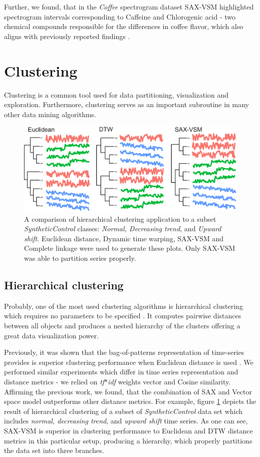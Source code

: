 \documentclass{llncs}
\newcommand{\myfigureshrinker}{\vspace{-1cm}}
\begin{document}
Further, we found, that in the \textit{Coffee} spectrogram dataset SAX-VSM highlighted spectrogram
intervals corresponding to Caffeine and Chlorogenic acid - two chemical compounds responsible for
the differences in coffee flavor, which also aligns with previously reported findings \cite{coffee}.
\section{Clustering}
Clustering is a common tool used for data partitioning, visualization and exploration. Furthermore, 
clustering serves as an important subroutine in many other data mining algorithms.
\begin{figure}[t]
   \myfigureshrinker
   \centering
   \includegraphics[width=115mm]{figures/clustering.eps}
   \caption{A comparison of hierarchical clustering application to a subset 
\textit{SyntheticControl} classes: \textit{Normal, Decreasing trend}, and \textit{Upward shift}. 
Euclidean distance, Dynamic time warping, SAX-VSM and Complete linkage were used to 
generate these plots. Only SAX-VSM was able to partition series properly.                           
   }
   \label{fig:hc}
\end{figure}

\subsection{Hierarchical clustering}
Probably, one of the most used clustering algorithms is hierarchical clustering which requires no
parameters to be specified \cite{hcs}. It computes pairwise distances between all objects and 
produces a nested hierarchy of the clusters offering a great data visualization power. 

Previously, it was shown that the bag-of-patterns representation of time-series
provides is superior clustering performance when Euclidean distance is used \cite{bag_patterns}. 
We performed similar experiments which differ in time series representation and distance
metrics - we relied on \textit{tf$\ast$idf} weights vector and Cosine similarity. 
Affirming the previous work, we found, that the combination of SAX and Vector space model
outperforms other distance metrics. For example, figure \ref{fig:hc} depicts the result 
of hierarchical clustering of a subset of \textit{SyntheticControl} data set which
includes \textit{normal, decreasing trend}, and \textit{upward shift} time series.
As one can see, SAX-VSM is superior in clustering performance to Euclidean and DTW distance 
metrics in this particular setup, producing a hierarchy, which properly partitions the data set 
into three branches.
\end{document}

